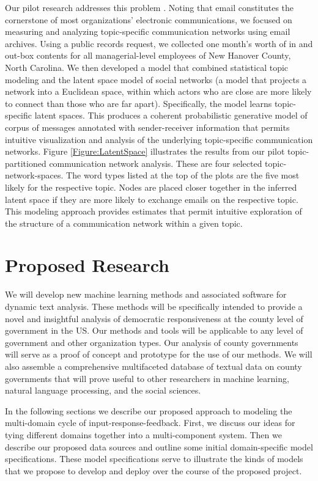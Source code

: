Our pilot research addresses this problem \cite{Krafft2012}. Noting that email constitutes the cornerstone of most organizations' electronic communications, we focused on measuring and analyzing topic-specific communication networks using email archives. Using a public records request, we collected one month's worth of in and out-box contents for all managerial-level employees of New Hanover County, North Carolina. We then developed a model that combined statistical topic modeling and the latent space model of social networks (a model that projects a network into a Euclidean space, within which actors who are close are more likely to connect than those who are far apart). Specifically, the model learns topic-specific latent spaces. This produces a coherent probabilistic generative model of corpus of messages annotated with sender-receiver information that permits intuitive visualization and analysis of the underlying topic-specific communication networks. Figure
\ref{Figure:LatentSpace} illustrates the results from our pilot
topic-partitioned communication network analysis. These
are four selected topic-network-spaces. The word types listed at the
top of the plots are the five most likely for the respective
topic. Nodes are placed closer together in the inferred latent space
if they are more likely to exchange emails on the respective
topic. This modeling approach provides estimates that permit intuitive
exploration of the structure of a communication network within a given
topic.


\section{Proposed Research}

We will develop new machine learning methods and associated software
for dynamic text analysis. These methods will be specifically intended
to provide a novel and insightful analysis of democratic
responsiveness at the county level of government in the US. Our
methods and tools will be applicable to any level of government and
other organization types. Our analysis of county governments will
serve as a proof of concept and prototype for the use of our
methods. We will also assemble a comprehensive multifaceted database
of textual data on county governments that will prove useful to other
researchers in machine learning, natural language processing, and the
social sciences.

In the following sections we describe our proposed approach to
modeling the multi-domain cycle of input-response-feedback. First, we
discuss our ideas for tying different domains together into a
multi-component system. Then we describe our proposed data sources and
outline some initial domain-specific model specifications. These model
specifications serve to illustrate the kinds of models that we propose
to develop and deploy over the course of the proposed project.

